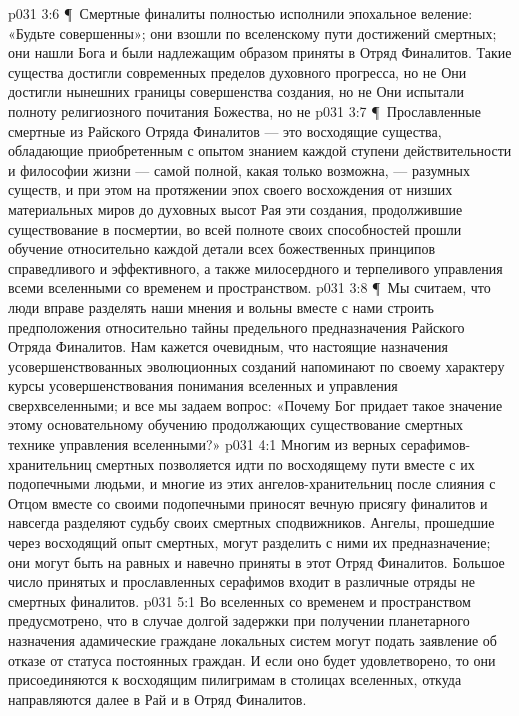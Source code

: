 \vs p031 3:6 \P\ \bibnobreakspace Смертные финалиты полностью исполнили эпохальное веление: «Будьте совершенны»; они взошли по вселенскому пути достижений смертных; они нашли Бога и были надлежащим образом приняты в Отряд Финалитов. Такие существа достигли современных пределов духовного прогресса, но не  Они достигли нынешних границы совершенства создания, но не  Они испытали полноту религиозного почитания Божества, но не 
\vs p031 3:7 \P\ \bibnobreakspace Прославленные смертные из Райского Отряда Финалитов --- это восходящие существа, обладающие приобретенным с опытом знанием каждой ступени действительности и философии жизни --- самой полной, какая только возможна, --- разумных существ, и при этом на протяжении эпох своего восхождения от низших материальных миров до духовных высот Рая эти создания, продолжившие существование в посмертии, во всей полноте своих способностей прошли обучение относительно каждой детали всех божественных принципов справедливого и эффективного, а также милосердного и терпеливого управления всеми вселенными со временем и пространством.
\vs p031 3:8 \P\ Мы считаем, что люди вправе разделять наши мнения и вольны вместе с нами строить предположения относительно тайны предельного предназначения Райского Отряда Финалитов. Нам кажется очевидным, что настоящие назначения усовершенствованных эволюционных созданий напоминают по своему характеру курсы усовершенствования понимания вселенных и управления сверхвселенными; и все мы задаем вопрос: «Почему Бог придает такое значение этому основательному обучению продолжающих существование смертных технике управления вселенными?»
\vs p031 4:1 Многим из верных серафимов\hyp{}хранительниц смертных позволяется идти по восходящему пути вместе с их подопечными людьми, и многие из этих ангелов\hyp{}хранительниц после слияния с Отцом вместе со своими подопечными приносят вечную присягу финалитов и навсегда разделяют судьбу своих смертных сподвижников. Ангелы, прошедшие через восходящий опыт смертных, могут разделить с ними их предназначение; они могут быть на равных и навечно приняты в этот Отряд Финалитов. Большое число принятых и прославленных серафимов входит в различные отряды не смертных финалитов.
\vs p031 5:1 Во вселенных со временем и пространством предусмотрено, что в случае долгой задержки при получении планетарного назначения адамические граждане локальных систем могут подать заявление об отказе от статуса постоянных граждан. И если оно будет удовлетворено, то они присоединяются к восходящим пилигримам в столицах вселенных, откуда направляются далее в Рай и в Отряд Финалитов.
